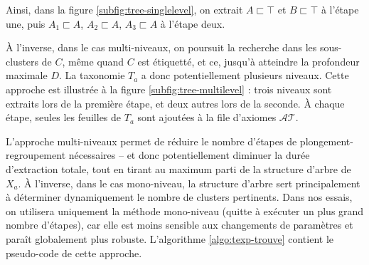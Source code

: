 Ainsi, dans la figure \ref{subfig:tree-singlelevel}, on extrait $A \sqsubset \top$ et $B \sqsubset \top$ à l'étape une, puis $A_1 \sqsubset A$, $A_2 \sqsubset A$, $A_3 \sqsubset A$ à l'étape deux.

À l'inverse, dans le cas multi-niveaux, on poursuit la recherche dans les sous-clusters de $C$, même quand $C$ est étiquetté, et ce, jusqu'à atteindre la profondeur maximale $D$. La taxonomie $T_a$ a donc potentiellement plusieurs niveaux. Cette approche est illustrée à la figure \ref{subfig:tree-multilevel} : trois niveaux sont extraits lors de la première étape, et deux autres lors de la seconde. À chaque étape, seules les feuilles de $T_a$ sont ajoutées à la file d'axiomes $\mathcal{AT}$.




L'approche multi-niveaux permet de réduire le nombre d'étapes de plongement-regroupement nécessaires – et donc potentiellement diminuer la durée d'extraction totale, tout en tirant au maximum parti de la structure d'arbre de $X_a$. À l'inverse, dans le cas mono-niveau, la structure d'arbre sert principalement à déterminer dynamiquement le nombre de clusters pertinents. Dans nos essais, on utilisera uniquement la méthode mono-niveau (quitte à exécuter un plus grand nombre d'étapes), car elle est moins sensible aux changements de paramètres et paraît globalement plus robuste. L'algorithme \ref{algo:texp-trouve} contient le pseudo-code de cette approche.

